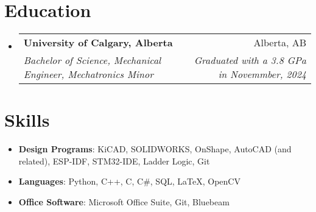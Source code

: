 \documentclass[letterpaper,11pt]{article}
\makeatletter
\newcommand{\resumeItem}[2]{
  \item\small{
    \textbf{#1}{: #2 \vspace{-2pt}}
  }
}
\newcommand{\resumeSubheading}[4]{
  \vspace{-1pt}\item
    \begin{tabular*}{0.97\textwidth}[t]{l@{\extracolsep{\fill}}r}
      \textbf{#1} & #2 \\
      \textit{\small#3} & \textit{\small #4} \\
    \end{tabular*}\vspace{-5pt}
}
\newcommand{\resumeSubSubheading}[2]{
    \begin{tabular*}{0.97\textwidth}{l@{\extracolsep{\fill}}r}
      \textit{\small#1} & \textit{\small #2} \\
    \end{tabular*}\vspace{-5pt}
}
\newcommand{\resumeSubItem}[2]{\resumeItem{#1}{#2}\vspace{-4pt}}
\newcommand{\resumeSubHeadingListStart}{\begin{itemize}[leftmargin=*]}
\newcommand{\resumeSubHeadingListEnd}{\end{itemize}}
\makeatother
\begin{document}
\section{Education}
  \resumeSubHeadingListStart
    \resumeSubheading
      {University of Calgary, Alberta}{Alberta, AB}
      {Bachelor of Science, Mechanical Engineer, Mechatronics Minor}{Graduated with a 3.8 GPa in Novemmber, 2024}
  \resumeSubHeadingListEnd

\section{Skills}
 \resumeSubHeadingListStart
   \resumeSubItem{Design Programs}{KiCAD, SOLIDWORKS, OnShape, AutoCAD (and related), ESP-IDF, STM32-IDE, Ladder Logic, Git}
   \resumeSubItem{Languages}{Python, C++, C, C\#, SQL, \LaTeX, OpenCV}
   \resumeSubItem{Office Software}{Microsoft Office Suite, Git, Bluebeam}
 \resumeSubHeadingListEnd



\end{document}
